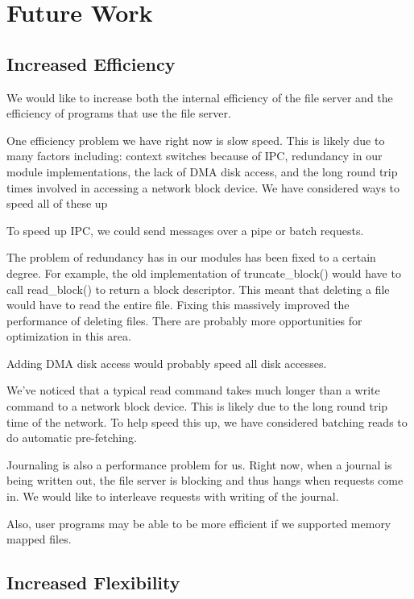 \section{Future Work}
\label{sec:future}

\subsection{Increased Efficiency}

We would like to increase both the internal efficiency of the file server and
the efficiency of programs that use the file server.

One efficiency problem we have right now is slow speed. This is likely due to
many factors including: context switches because of IPC, redundancy in our
module implementations, the lack of DMA disk access, and the long round trip
times involved in accessing a network block device. We have considered ways to
speed all of these up

To speed up IPC, we could send messages over a pipe or batch requests.

The problem of redundancy has in our modules has been fixed to a certain degree.
For example, the old implementation of truncate\_block() would have to call
read\_block() to return a block descriptor. This meant that deleting a file
would have to read the entire file. Fixing this massively improved the
performance of deleting files. There are probably more opportunities for
optimization in this area.

Adding DMA disk access would probably speed all disk accesses.

We've noticed that a typical read command takes much longer than a write command
to a network block device. This is likely due to the long round trip time of the
network. To help speed this up, we have considered batching reads to do
automatic pre-fetching.

Journaling is also a performance problem for us. Right now, when a journal is
being written out, the file server is blocking and thus hangs when requests come
in. We would like to interleave requests with writing of the journal.

Also, user programs may be able to be more efficient if we supported memory
mapped files.

\subsection{Increased Flexibility}

